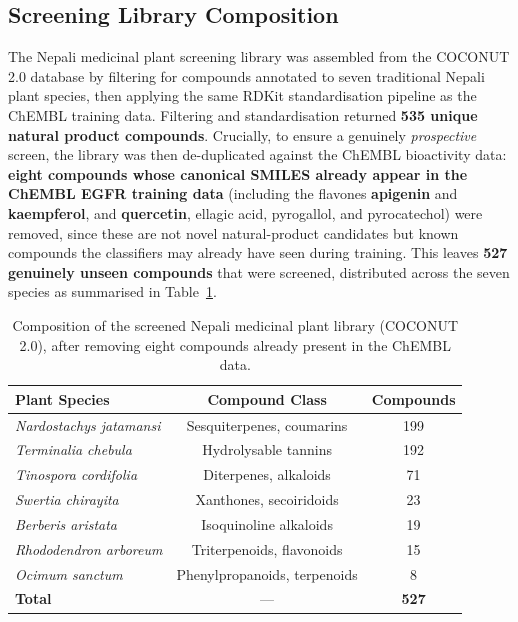 \subsection{Screening Library Composition}

The Nepali medicinal plant screening library was assembled from the COCONUT 2.0
database by filtering for compounds annotated to seven traditional Nepali plant
species, then applying the same RDKit standardisation pipeline as the ChEMBL training
data. Filtering and standardisation returned \textbf{535 unique natural product
compounds}. Crucially, to ensure a genuinely \emph{prospective} screen, the library
was then de-duplicated against the ChEMBL bioactivity data: \textbf{eight compounds
whose canonical SMILES already appear in the ChEMBL EGFR training data} (including the flavones
\textbf{apigenin} and \textbf{kaempferol}, and \textbf{quercetin}, ellagic acid,
pyrogallol, and pyrocatechol) were removed, since these are not novel natural-product
candidates but known compounds the classifiers may already have seen during training.
This leaves \textbf{527 genuinely unseen compounds} that were screened, distributed
across the seven species as summarised in Table~\ref{tab:library_comp}.

\begin{table}[H]
\centering
\caption{Composition of the screened Nepali medicinal plant library (COCONUT 2.0),
         after removing eight compounds already present in the ChEMBL data.}
\label{tab:library_comp}
{\singlespacing
\begin{tabular}{lcc}
\toprule
\textbf{Plant Species} & \textbf{Compound Class} & \textbf{Compounds} \\
\midrule
\textit{Nardostachys jatamansi} & Sesquiterpenes, coumarins    & 199 \\
\textit{Terminalia chebula}     & Hydrolysable tannins         & 192 \\
\textit{Tinospora cordifolia}   & Diterpenes, alkaloids        & 71 \\
\textit{Swertia chirayita}      & Xanthones, secoiridoids      & 23 \\
\textit{Berberis aristata}      & Isoquinoline alkaloids       & 19 \\
\textit{Rhododendron arboreum}  & Triterpenoids, flavonoids    & 15 \\
\textit{Ocimum sanctum}         & Phenylpropanoids, terpenoids & 8  \\
\midrule
\textbf{Total} & --- & \textbf{527} \\
\bottomrule
\end{tabular}
}
\end{table}

